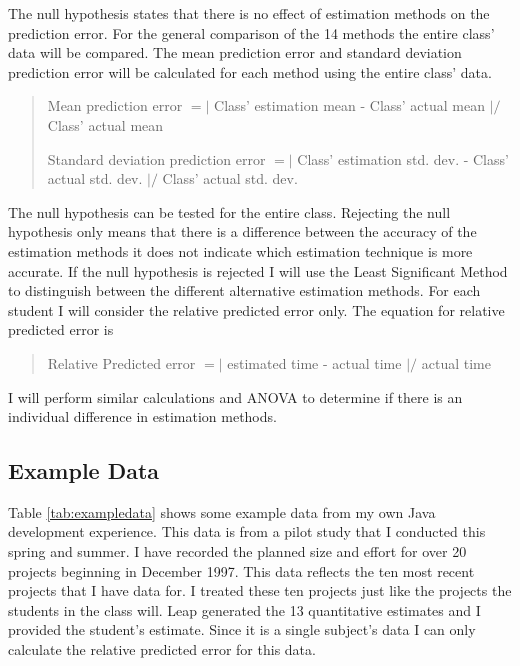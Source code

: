 The null hypothesis states that there is no effect of estimation methods
on the prediction error.  For the general comparison of the 14 methods
the entire class' data will be compared.  The mean prediction error and
standard deviation prediction error will be calculated for each method
using the entire class' data.
\begin{quote}
Mean prediction error $ = | $ Class' estimation mean  - Class' actual mean $ | /
$ Class' actual mean

Standard deviation prediction error $  = | $ Class' estimation std. dev. -
Class' actual std. dev. $ | / $ Class' actual std. dev. 
\end{quote}

The null hypothesis can be tested for the entire class.  Rejecting the null
hypothesis only means that there is a difference between the accuracy of the
estimation methods it does not indicate which estimation technique is more
accurate.  If the null hypothesis is rejected I will use the Least Significant
Method to distinguish between the different alternative estimation methods.
For each student I will consider the relative predicted error only.  The
equation for relative predicted error is

\begin{quote}
        Relative Predicted error $ = | $ estimated time - actual time $ | / $ actual
        time
\end{quote}

I will perform similar calculations and ANOVA to determine if there is an individual difference in estimation 
methods. 

\subsection{Example Data}

Table \ref{tab:exampledata} shows some example data from my own Java development
experience.  This data is from a pilot study that I conducted this spring and
summer.  I have recorded the planned size and effort for over 20 projects
beginning in December 1997.  This data reflects the ten most recent projects
that I have data for.  I treated these ten projects just like the projects the
students in the class will.  Leap generated the 13 quantitative estimates and I
provided the student's estimate.  Since it is a single subject's data I can
only calculate the relative predicted error for this data.



